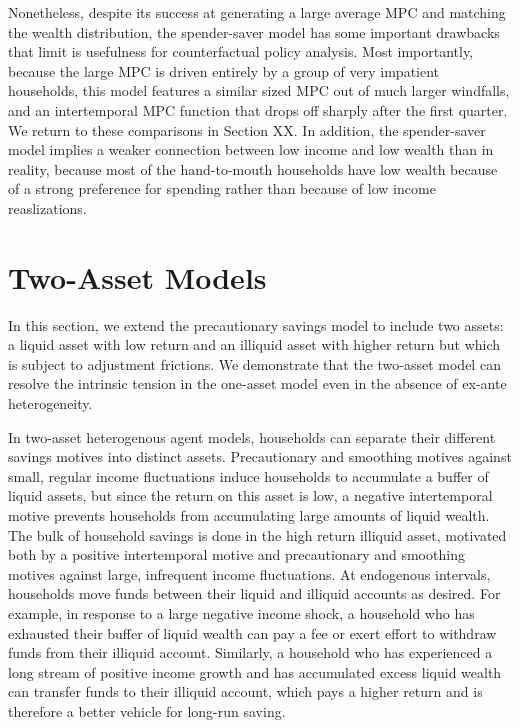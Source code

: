 Nonetheless, despite its success at generating a large average MPC and matching the wealth distribution, the spender-saver model has some important drawbacks that limit is usefulness for counterfactual policy analysis. Most importantly, because the large MPC is driven entirely by a group of very impatient households, this model features a similar sized MPC out of much larger windfalls, and an intertemporal MPC function that drops off sharply after the first quarter. We return to these comparisons in Section XX. In addition, the spender-saver model implies a weaker connection between low income and low wealth than in reality, because most of the hand-to-mouth households have low wealth because of a strong preference for spending rather than because of low income reaslizations.

\section{Two-Asset Models} \label{sec:two_asset} 

In this section, we extend the precautionary savings model to include two assets: a liquid asset with low return and an illiquid asset with higher return but which is subject to adjustment frictions. We demonstrate that the two-asset model can resolve the intrinsic tension in the one-asset model even in the absence of ex-ante heterogeneity.

In two-asset heterogenous agent models, households can separate their different savings motives into distinct assets. Precautionary and smoothing motives against small, regular income fluctuations induce households to accumulate a buffer of liquid assets, but since the return on this asset is low, a negative intertemporal motive prevents households from accumulating large amounts of liquid wealth. The bulk of household savings is done in the high return illiquid asset, motivated both by a positive  intertemporal motive and precautionary and smoothing motives against large, infrequent income fluctuations. At endogenous intervals, households move funds between their liquid and illiquid accounts as desired. For example, in response to a large negative income shock, a household who has exhausted their buffer of liquid wealth can pay a fee or exert effort to withdraw funds from their illiquid account. Similarly, a household who has experienced a long stream of positive income growth and has accumulated excess liquid wealth can transfer funds to their illiquid account, which pays a higher return and is therefore a better vehicle for long-run saving. 

